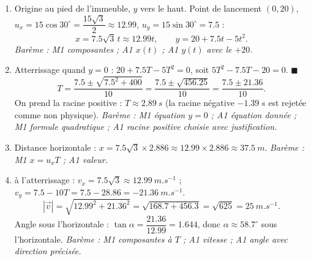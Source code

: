 \documentclass[11pt]{article}
\begin{document}
\begin{corrige}
\begin{enumerate}
\item Origine au pied de l'immeuble, $y$ vers le haut. Point de lancement $(0, 20)$, $u_x = 15\cos 30^\circ = \dfrac{15\sqrt{3}}{2} \approx 12.99$, $u_y = 15\sin 30^\circ = 7.5$ :
\[ x = 7.5\sqrt{3}\,t \approx 12.99t, \qquad y = 20 + 7.5t - 5t^2. \]
\emph{Bar\`eme : M1 composantes ; A1 $x(t)$ ; A1 $y(t)$ avec le $+20$.}

\item Atterrissage quand $y = 0$ : $20 + 7.5T - 5T^2 = 0$, soit $5T^2 - 7.5T - 20 = 0$. $\blacksquare$
\[ T = \frac{7.5 \pm \sqrt{7.5^2 + 400}}{10} = \frac{7.5 \pm \sqrt{456.25}}{10} = \frac{7.5 \pm 21.36}{10}. \]
On prend la racine positive : $T \approx \SI{2.89}{s}$ (la racine n\'egative $-1.39$ s est rejet\'ee comme non physique).
\emph{Bar\`eme : M1 \'equation $y = 0$ ; A1 \'equation donn\'ee ; M1 formule quadratique ; A1 racine positive choisie avec justification.}

\item Distance horizontale : $x = 7.5\sqrt{3} \times 2.886 \approx 12.99 \times 2.886 \approx \SI{37.5}{m}$.
\emph{Bar\`eme : M1 $x = u_x T$ ; A1 valeur.}

\item \`a l'atterrissage : $v_x = 7.5\sqrt{3} \approx \SI{12.99}{m.s^{-1}}$ ; $v_y = 7.5 - 10T = 7.5 - 28.86 = -\SI{21.36}{m.s^{-1}}$.
\[ |\vec{v}| = \sqrt{12.99^2 + 21.36^2} = \sqrt{168.7 + 456.3} = \sqrt{625} = \SI{25}{m.s^{-1}}. \]
Angle sous l'horizontale : $\tan\alpha = \dfrac{21.36}{12.99} = 1.644$, donc $\alpha \approx 58.7^\circ$ sous l'horizontale.
\emph{Bar\`eme : M1 composantes \`a $T$ ; A1 vitesse ; A1 angle avec direction pr\'ecis\'ee.}
\end{enumerate}
\end{corrige}
\end{document}
